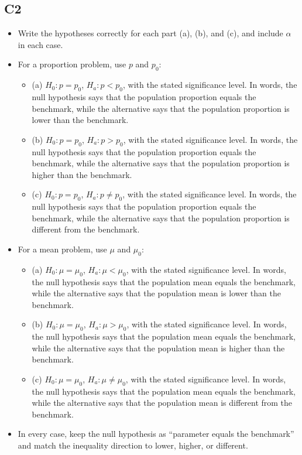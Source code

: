 	\subsection*{C2}
	\begin{itemize}
		\item Write the hypotheses correctly for each part (a), (b), and (c), and include \(\alpha\) in each case.
		\item For a proportion problem, use \(p\) and \(p_0\):
		\begin{itemize}
			\item (a) \(H_0\colon p=p_0\), \(H_a\colon p<p_0\), with the stated significance level. In words, the null hypothesis says that the population proportion equals the benchmark, while the alternative says that the population proportion is lower than the benchmark.
			\item (b) \(H_0\colon p=p_0\), \(H_a\colon p>p_0\), with the stated significance level. In words, the null hypothesis says that the population proportion equals the benchmark, while the alternative says that the population proportion is higher than the benchmark.
			\item (c) \(H_0\colon p=p_0\), \(H_a\colon p\ne p_0\), with the stated significance level. In words, the null hypothesis says that the population proportion equals the benchmark, while the alternative says that the population proportion is different from the benchmark.
		\end{itemize}
		\item For a mean problem, use \(\mu\) and \(\mu_0\):
		\begin{itemize}
			\item (a) \(H_0\colon \mu=\mu_0\), \(H_a\colon \mu<\mu_0\), with the stated significance level. In words, the null hypothesis says that the population mean equals the benchmark, while the alternative says that the population mean is lower than the benchmark.
			\item (b) \(H_0\colon \mu=\mu_0\), \(H_a\colon \mu>\mu_0\), with the stated significance level. In words, the null hypothesis says that the population mean equals the benchmark, while the alternative says that the population mean is higher than the benchmark.
			\item (c) \(H_0\colon \mu=\mu_0\), \(H_a\colon \mu\ne \mu_0\), with the stated significance level. In words, the null hypothesis says that the population mean equals the benchmark, while the alternative says that the population mean is different from the benchmark.
		\end{itemize}
		\item In every case, keep the null hypothesis as ``parameter equals the benchmark'' and match the inequality direction to lower, higher, or different.
	\end{itemize}
	
